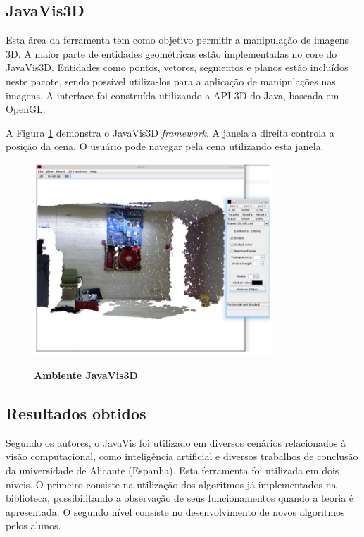 \documentclass[
	12pt,				%
	oneside,			%
	a4paper,			%
	english,			%
	french,				%
	spanish,			%
	brazil,				%
	]{abntex2}
\begin{document}
\subsection{JavaVis3D}

Esta área da ferramenta tem como objetivo permitir a manipulação de imagens 3D. A maior parte de entidades geométricas estão implementadas no core do JavaVis3D. Entidades como pontos, vetores, segmentos e planos estão incluídos neste pacote, sendo possível utiliza-los para a aplicação de manipulações nas imagens. A interface foi construída utilizando a API 3D do Java, baseada em OpenGL.

A Figura \ref{fig:javavis_3d} demonstra o JavaVis3D \textit{framework}. A janela a direita controla a posição da cena. O usuário pode navegar pela cena utilizando esta janela.

\begin{figure}[ht]
\centering
\caption{\textbf{Ambiente JavaVis3D}}
\includegraphics[width=0.8\textwidth]{imagens/javavis_3d.png}
\label{fig:javavis_3d}
\end{figure}

\subsection{Resultados obtidos}

Segundo os autores, o JavaVis foi utilizado em diversos cenários relacionados à visão computacional, como inteligência artificial e diversos trabalhos de conclusão da universidade de Alicante (Espanha). Esta ferramenta foi utilizada em dois níveis. O primeiro consiste na utilização dos algoritmos já implementados na biblioteca, possibilitando a observação de seus funcionamentos quando a teoria é apresentada. O segundo nível consiste no desenvolvimento de novos algoritmos pelos alunos.
\end{document}
